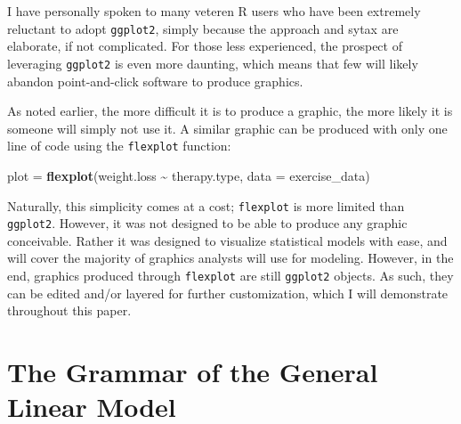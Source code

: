 \documentclass[
  man]{apa6}
\newenvironment{Shaded}{\begin{snugshade}}{\end{snugshade}}
\newcommand{\DataTypeTok}[1]{\textcolor[rgb]{0.13,0.29,0.53}{#1}}
\newcommand{\KeywordTok}[1]{\textcolor[rgb]{0.13,0.29,0.53}{\textbf{#1}}}
\newcommand{\NormalTok}[1]{#1}
\newcommand{\OperatorTok}[1]{\textcolor[rgb]{0.81,0.36,0.00}{\textbf{#1}}}
\newcommand{\StringTok}[1]{\textcolor[rgb]{0.31,0.60,0.02}{#1}}
\begin{document}
\normalsize

I have personally spoken to many veteren R users who have been extremely reluctant to adopt \texttt{ggplot2}, simply because the approach and sytax are elaborate, if not complicated. For those less experienced, the prospect of leveraging \texttt{ggplot2} is even more daunting, which means that few will likely abandon point-and-click software to produce graphics.

As noted earlier, the more difficult it is to produce a graphic, the more likely it is someone will simply not use it. A similar graphic can be produced with only one line of code using the \texttt{flexplot} function:

\small

\begin{Shaded}
\begin{Highlighting}[]
\NormalTok{plot =}\StringTok{ }\KeywordTok{flexplot}\NormalTok{(weight.loss }\OperatorTok{\textasciitilde{}}\StringTok{ }\NormalTok{therapy.type, }\DataTypeTok{data =}\NormalTok{ exercise\_data)}
\end{Highlighting}
\end{Shaded}

\normalsize

Naturally, this simplicity comes at a cost; \texttt{flexplot} is more limited than \texttt{ggplot2}. However, it was not designed to be able to produce any graphic conceivable. Rather it was designed to visualize statistical models with ease, and will cover the majority of graphics analysts will use for modeling. However, in the end, graphics produced through \texttt{flexplot} are still \texttt{ggplot2} objects. As such, they can be edited and/or layered for further customization, which I will demonstrate throughout this paper.

\hypertarget{the-grammar-of-the-general-linear-model}{%
\section{The Grammar of the General Linear Model}\label{the-grammar-of-the-general-linear-model}}
\end{document}

